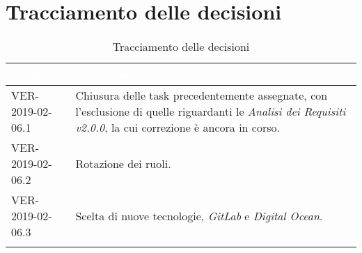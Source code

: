 
\section{Tracciamento delle decisioni}

\begin{longtable}{|C{.40\textwidth}|C{.60\textwidth}|}
\hline
{}\textbf{\textcolor{white}{Codice}} & \textbf{\textcolor{white}{Decisione}}\\
\hline
VER-2019-02-06.1 & Chiusura delle task precedentemente assegnate, con l'esclusione di quelle riguardanti le \textit{Analisi dei Requisiti v2.0.0}, la cui correzione è ancora in corso.\\
\hline
{}VER-2019-02-06.2 & Rotazione dei ruoli. \\
\hline
VER-2019-02-06.3 & Scelta di nuove tecnologie, \textit{GitLab} e \textit{Digital Ocean}. \\
\hline

\caption{Tracciamento delle decisioni}
\end{longtable}

